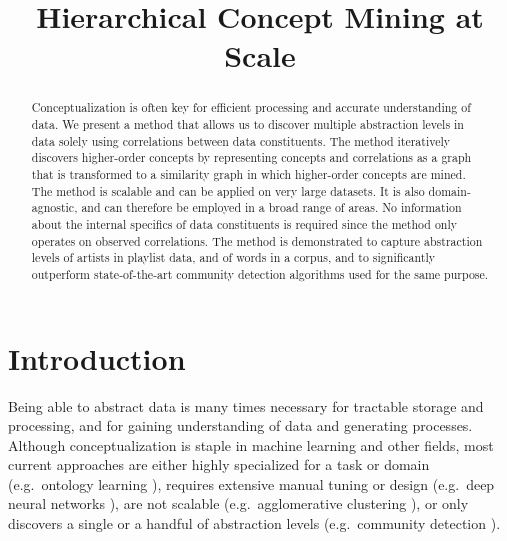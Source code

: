 \documentclass[conference]{IEEEtran}
\newcommand{\hide}[1]{}
\begin{document}
\title{Hierarchical Concept Mining at Scale}

\author{\hide{
\IEEEauthorblockN{Olof G\"{o}rnerup}
\IEEEauthorblockA{Swedish Institute of\\
Computer Science (SICS)\\
SE-164 29 Kista, Sweden\\
Email: olof@sics.se}	
\and
\IEEEauthorblockN{Daniel Gillblad}
\IEEEauthorblockA{Swedish Institute of\\
Computer Science (SICS)\\
SE-164 29 Kista, Sweden\\
Email: dgi@sics.se}
\and
\IEEEauthorblockN{Theodore Vasiloudis}
\IEEEauthorblockA{Swedish Institute of\\
Computer Science (SICS)\\
SE-164 29 Kista, Sweden\\
Email: tvas@sics.se}
}}

\maketitle

\begin{abstract}
Conceptualization is often key for efficient processing and accurate understanding of data. 
We present a method that allows us to discover multiple abstraction levels in data solely using correlations between data
constituents. The method iteratively discovers higher-order concepts by representing concepts and correlations
as a graph that is transformed to a similarity graph in which higher-order concepts are mined. 
The method is scalable and can be applied on very large datasets. It is also domain-agnostic, and
can therefore be employed in a broad range of areas. No information about the internal specifics of data constituents is required 
since the method only operates on observed correlations. The method is demonstrated to capture abstraction 
levels of artists in playlist data, and of words in a corpus, and to significantly outperform state-of-the-art community 
detection algorithms used for the same purpose.
\end{abstract}

\section{Introduction}
\label{sec:introduction}

Being able to abstract data is many times necessary for tractable storage and processing, and for gaining
understanding of data and generating processes.
Although conceptualization is staple in machine learning and other fields, most current approaches
are either highly specialized for a task or domain (e.g.\ ontology learning \cite{Wong2012ontology}), 
requires extensive manual tuning or design (e.g.\ deep neural networks \cite{LeCun15}), 
are not scalable (e.g.\ agglomerative clustering \cite{Sibson73}),
or only discovers a single or a handful of abstraction levels (e.g.\ community detection \cite{Fortunato10}).
\end{document}
